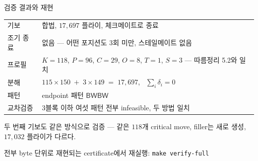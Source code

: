 \documentclass[aspectratio=169,10pt]{beamer}
\newcommand{\B}{\mathsf{B}}
\newcommand{\W}{\mathsf{W}}
\begin{document}
\begin{frame}{검증 결과와 재현}
  \centering
  \vspace{0.65cm}
  {\small
  \begin{tabular}{@{}ll@{}}
    \toprule
    기보 & 합법, $17{,}697$ 플라이, 체크메이트로 종료 \\
    조기 종료 & 없음 --- 어떤 포지션도 3회 미만, 스테일메이트 없음 \\
    프로필 & $K = 118$, $P = 96$, $C = 29$, $O = 8$, $T = 1$, $S = 3$
             --- 따름정리 5.2와 일치 \\
    분해 & $115 \times 150 \;+\; 3 \times 149 \;=\; 17{,}697$,
           \ $\sum_i \delta_i = 0$ \\
    패턴 & endpoint 패턴 $\B\W\B\W$ \\
    교차검증 & 3블록 이하 여섯 패턴 전부 infeasible, 두 방법 일치 \\
    \bottomrule
  \end{tabular}}
  \par\vspace{0.85cm}
  {\small 두 번째 기보도 같은 방식으로 검증 --- 같은 $118$개 critical move,
   filler는 새로 생성, $17{,}032$ 플라이가 다르다.}
  \par\vspace{0.3cm}
  {\scriptsize\color{lcgrey}
   전부 byte 단위로 재현되는 certificate에서 재실행: \texttt{make verify-full}}
\end{frame}

\end{document}
